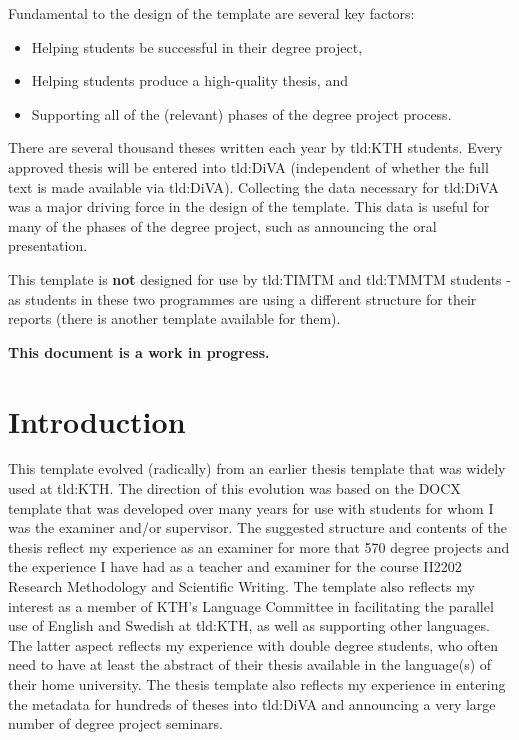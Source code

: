 Fundamental to the design of the template are several key factors:
\begin{itemize}
    \item Helping students be successful in their degree project,
    \item Helping students produce a high-quality thesis, and
    \item Supporting all of the (relevant) phases of the degree project process.
\end{itemize}

There are several thousand theses written each year by \gls{tld:KTH} students. Every approved thesis will be entered into \gls{tld:DiVA} (independent of whether the full text is made available via \gls{tld:DiVA}). Collecting the data necessary for \gls{tld:DiVA} was a major driving force in the design of the template. This data is useful for many of the phases of the degree project, such as announcing the oral presentation.
    
This template is \textbf{not} designed for use by \gls{tld:TIMTM} and \gls{tld:TMMTM} students - as students in these two programmes are using a different structure for their reports (there is another template available for them).

\textbf{This document is a work in progress.}

\section{Introduction}
This template evolved (radically) from an earlier thesis template that was widely used at \gls{tld:KTH}. The direction of this evolution was based on the DOCX template that was developed over many years for use with students for whom I was the examiner and/or supervisor. The suggested structure and contents of the thesis reflect my experience as an examiner for more that 570 degree projects and the experience I have had as a teacher and examiner for the course II2202 Research Methodology and Scientific Writing. The template also reflects my interest as a member of KTH's Language Committee in facilitating the parallel use of English and Swedish at \gls{tld:KTH}, as well as supporting other languages. The latter aspect
reflects my experience with double degree students, who often need to have at least the abstract of their thesis available in the language(s) of their home university. The thesis template also reflects
my experience in entering the metadata for hundreds of theses into \gls{tld:DiVA} and announcing a very large number of degree project seminars.

